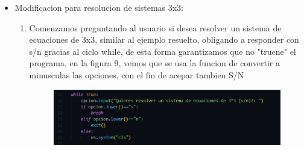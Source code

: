 \documentclass[12pt]{article}
\begin{document}
\begin{itemize}
\begin{enumerate}
\end{enumerate}
\item Modificacion para resolucion de sistemas 3x3:\\
	\begin{enumerate}
	\item Comenzamos preguntando al usuario si desea resolver un sistema de ecuaciones de 3x3, similar al ejemplo resuelto, obligando a responder con s/n gracias al ciclo while, de esta forma garantizamos que no "truene" el programa, en la figura 9, vemos que se usa la funcion de convertir a minusculas las opciones, con el fin de acepar tambien S/N
	
	\begin{figure}[H]
		\begin{center}
 			\includegraphics[width = .8\textwidth]{pregunta.png}
		\end{center} 
	\end{figure}
	

\end{enumerate}
\end{itemize}
\end{document}
